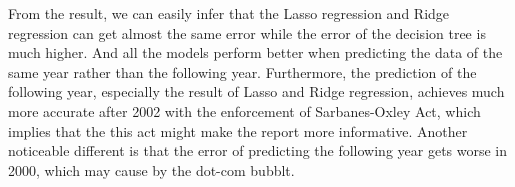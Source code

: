 \documentclass[11pt]{article}
\begin{document}

From the result, we can easily infer that the Lasso regression and Ridge regression can get almost the same error while the error of the decision tree is much higher. And all the models perform better when predicting the data of the same year rather than the following year. Furthermore, the prediction of the following year, especially the result of Lasso and Ridge regression, achieves much more accurate after 2002 with the enforcement of Sarbanes-Oxley Act, which implies that the this act might make the report more informative. Another noticeable different is that the error of predicting the following year gets worse in 2000, which may cause by the dot-com bubblt.
\end{document}
